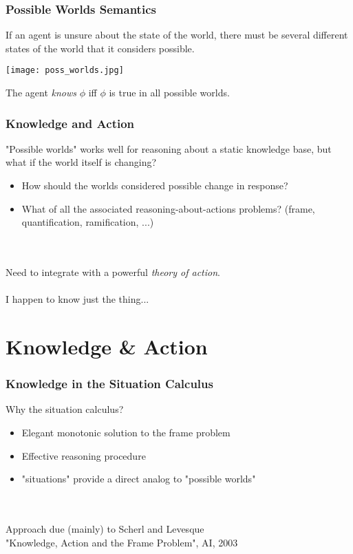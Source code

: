 \documentclass{beamer}
\begin{document}
\begin{frame}
\frametitle{Possible Worlds Semantics}

If an agent is unsure about the state of the world, there must be several
different states of the world that it considers possible.

\begin{center}
  \texttt{[image: poss\_worlds.jpg]}
\end{center}

The agent \emph{knows} $\phi$ iff $\phi$ is true in all possible worlds.

\end{frame}

\begin{frame}
\frametitle{Knowledge and Action}
"Possible worlds" works well for reasoning about a static knowledge base,
but what if the world itself is changing?
\begin{itemize}
\item  How should the worlds considered possible change in response?
\item  What of all the associated reasoning-about-actions problems? (frame, quantification, ramification, ...)
\end{itemize}
\ \\
\ \\
Need to integrate with a powerful \emph{theory of action}.
\pause
\ \\
\ \\
I happen to know just the thing...
\end{frame}

\section{Knowledge \& Action}

\begin{frame}
\frametitle{Knowledge in the Situation Calculus}

Why the situation calculus?
\begin{itemize}
\item Elegant monotonic solution to the frame problem
\item Effective reasoning procedure
\item "situations" provide a direct analog to "possible worlds"
\end{itemize}
\ \\
\ \\
Approach due (mainly) to Scherl and Levesque\\
"Knowledge, Action and the Frame Problem", AI, 2003

\end{frame}
\end{document}
